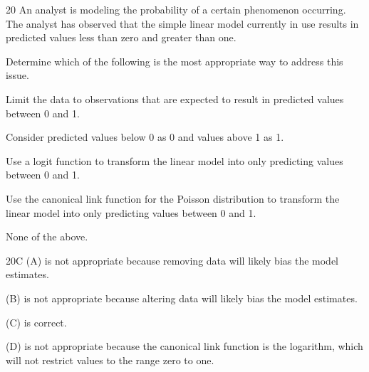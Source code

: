 \begin{question}{20}
An analyst is modeling the probability of a certain phenomenon occurring. The analyst has observed that the simple linear model currently in use results in predicted values less than zero and greater than one.

Determine which of the following is the most appropriate way to address this issue.

\begin{choices}
\item Limit the data to observations that are expected to result in predicted values between 0 and 1.
\item Consider predicted values below 0 as 0 and values above 1 as 1.
\item Use a logit function to transform the linear model into only predicting values between 0 and 1.
\item Use the canonical link function for the Poisson distribution to transform the linear model into only predicting values between 0 and 1.
\item None of the above.
\end{choices}
\end{question}
\begin{solution}{20}{C}
(A) is not appropriate because removing data will likely bias the model estimates.

(B) is not appropriate because altering data will likely bias the model estimates.

(C) is correct.

(D) is not appropriate because the canonical link function is the logarithm, which will not restrict values to the range zero to one.
\end{solution}

